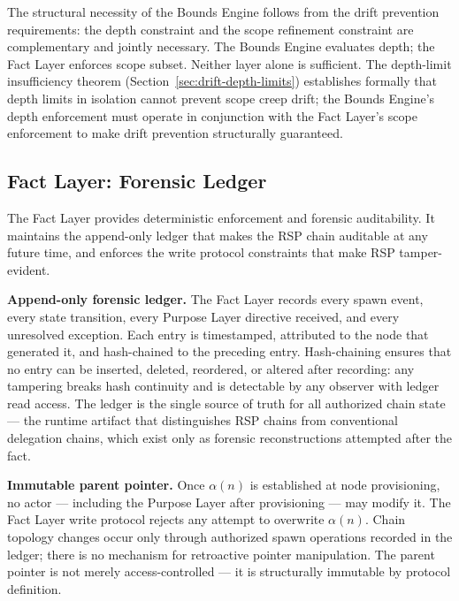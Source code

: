 The structural necessity of the Bounds Engine follows from the drift prevention requirements: the depth constraint and the scope refinement constraint are complementary and jointly necessary. The Bounds Engine evaluates depth; the Fact Layer enforces scope subset. Neither layer alone is sufficient. The depth-limit insufficiency theorem (Section~\ref{sec:drift-depth-limits}) establishes formally that depth limits in isolation cannot prevent scope creep drift; the Bounds Engine's depth enforcement must operate in conjunction with the Fact Layer's scope enforcement to make drift prevention structurally guaranteed.

\subsection{Fact Layer: Forensic Ledger}
\label{sec:rs-fact-ledger}

The Fact Layer provides deterministic enforcement and forensic auditability. It maintains the append-only ledger that makes the RSP chain auditable at any future time, and enforces the write protocol constraints that make RSP tamper-evident.

\medskip
\noindent\textbf{Append-only forensic ledger.} The Fact Layer records every spawn event, every state transition, every Purpose Layer directive received, and every unresolved exception. Each entry is timestamped, attributed to the node that generated it, and hash-chained to the preceding entry. Hash-chaining ensures that no entry can be inserted, deleted, reordered, or altered after recording: any tampering breaks hash continuity and is detectable by any observer with ledger read access. The ledger is the single source of truth for all authorized chain state --- the runtime artifact that distinguishes RSP chains from conventional delegation chains, which exist only as forensic reconstructions attempted after the fact.

\medskip
\noindent\textbf{Immutable parent pointer.} Once $\alpha(n)$ is established at node provisioning, no actor --- including the Purpose Layer after provisioning --- may modify it. The Fact Layer write protocol rejects any attempt to overwrite $\alpha(n)$. Chain topology changes occur only through authorized spawn operations recorded in the ledger; there is no mechanism for retroactive pointer manipulation. The parent pointer is not merely access-controlled --- it is structurally immutable by protocol definition.

